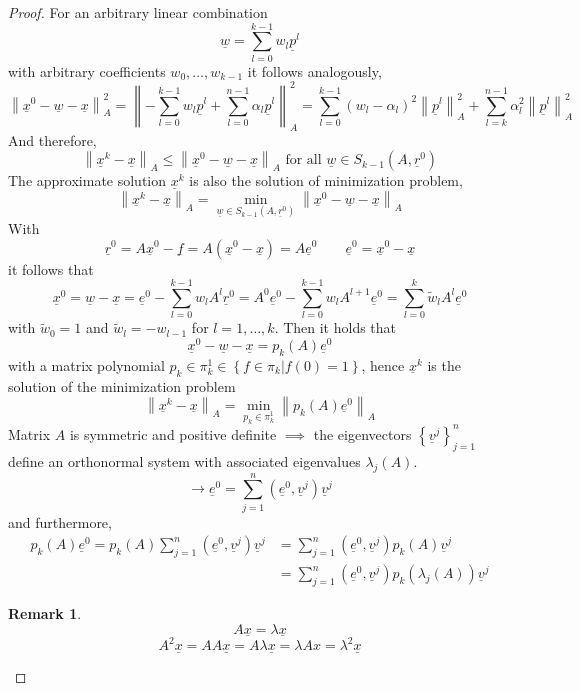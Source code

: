 \documentclass{article}
\newtheorem*{remark}{Remark}
\newcommand{\setdef}[2]{\left\{#1|#2\right\}}
\newcommand{\norm}[1]{\left\|#1\right\|}
\begin{document}
\begin{proof}
  For an arbitrary linear combination
  \[ \underline w = \sum_{l=0}^{k-1} w_l \underline p^l \]
  with arbitrary coefficients $w_0, \ldots, w_{k-1}$ it follows analogously,
  \[ \norm{\underline x^0 - \underline w - \underline x}_A^2 = \norm{-\sum_{l=0}^{k-1} w_l \underline p^l + \sum_{l=0}^{n-1} \alpha_l \underline p^l}_A^2 = \sum_{l=0}^{k-1} (w_l - \alpha_l)^2 \norm{\underline p^l}_A^2 + \sum_{l=k}^{n-1} \alpha_l^2 \norm{\underline p^l}_A^2 \]
  And therefore,
  \[ \norm{\underline x^k - \underline x}_A \leq \norm{\underline x^0 - \underline w - \underline x}_A \text{ for all } \underline w \in S_{k-1}(A, \underline r^0) \]
  The approximate solution $\underline x^k$ is also the solution of minimization problem,
  \[ \norm{\underline x^k - \underline x}_A = \min_{\underline w \in S_{k-1}(A, \underline r^0)} \norm{\underline x^0 - \underline w - \underline x}_A \]
  With
  \[ \underline r^0 = A \underline x^0 - \underline f = A (\underline x^0 - \underline x) = A \underline e^0 \qquad \underline e^0 = \underline x^0 - \underline x \]
  it follows that
  \[ \underline x^0 = \underline w - \underline x = \underline e^0 - \sum_{l=0}^{k-1} w_l A^l \underline r^0 = A^0 \underline e^0 - \sum_{l=0}^{k-1} w_l A^{l+1} \underline e^0 = \sum_{l=0}^k \tilde w_l A^l \underline e^0 \]
  with $\tilde w_0 = 1$ and $\tilde w_l = -w_{l-1}$ for $l=1,\ldots,k$. Then it holds that
  \[ \underline x^0 - \underline w - \underline x = p_k(A) \underline e^0 \]
  with a matrix polynomial $p_k \in \pi_k^1 \in \setdef{f \in \pi_k}{f(0) = 1}$,
  hence $\underline x^k$ is the solution of the minimization problem
  \[ \norm{\underline x^k - \underline x}_A = \min_{p_k \in \pi_k^1} \norm{p_k(A) \underline e^0}_A \]
  Matrix $A$ is symmetric and positive definite $\implies$ the eigenvectors $\left\{\underline v^j\right\}_{j=1}^n$ define an orthonormal system with associated eigenvalues $\lambda_j(A)$.
  \[ \rightarrow \underline e^0 = \sum_{j=1}^n (\underline e^0, \underline v^j) \underline v^j \]
  and furthermore,
  \begin{align*}
    p_k(A) \underline e^0
      = p_k(A) \sum_{j=1}^n (\underline e^0, \underline v^j) \underline v^j
      &= \sum_{j=1}^n (\underline e^0, \underline v^j) p_k(A) \underline v^j \\
      &= \sum_{j=1}^n (\underline e^0, \underline v^j) p_k(\lambda_j(A)) \underline v^j
  \end{align*}
  \begin{remark}
    \[ A \underline x = \lambda \underline x \]
    \[ A^2 \underline x = A A \underline x = A \lambda \underline x = \lambda A x = \lambda^2 \underline x \]

\end{remark}
\end{proof}
\end{document}
